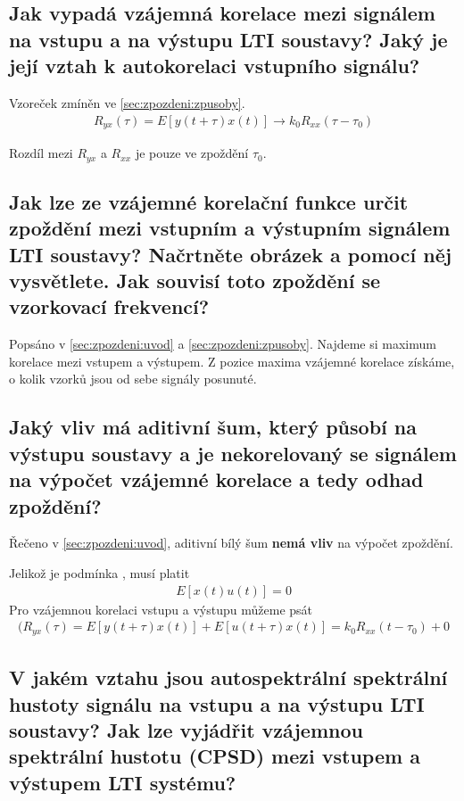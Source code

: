 \documentclass[a4paper,12pt]{article}   %
\newcommand{\mt}[1]{$#1$}
\begin{document}
\subsection{Jak vypadá vzájemná korelace mezi signálem na vstupu a na výstupu LTI soustavy? Jaký je její vztah k autokorelaci vstupního signálu?}
Vzoreček zmíněn ve \ref{sec:zpozdeni:zpusoby}.
\begin{align*}
        R_{yx}(\tau) = E[y(t+\tau)x(t)] \rightarrow k_0R_{xx}(\tau-\tau_0)
\end{align*}

Rozdíl mezi \mt{R_{yx}} a \mt{R_{xx}} je pouze ve zpoždění \mt{\tau_0}.


\subsection{Jak lze ze vzájemné korelační funkce určit zpoždění mezi vstupním a výstupním signálem LTI soustavy? Načrtněte obrázek a pomocí něj vysvětlete. Jak souvisí toto zpoždění se vzorkovací frekvencí?}
Popsáno v \ref{sec:zpozdeni:uvod} a \ref{sec:zpozdeni:zpusoby}. Najdeme si maximum korelace mezi vstupem a výstupem. Z pozice maxima vzájemné korelace získáme, o kolik vzorků jsou od sebe signály posunuté.


\subsection{Jaký vliv má aditivní šum, který působí na výstupu soustavy a je nekorelovaný se signálem na výpočet vzájemné korelace a tedy odhad zpoždění?}
Řečeno v \ref{sec:zpozdeni:uvod}, aditivní bílý šum \textbf{nemá vliv} na výpočet zpoždění. 

Jelikož je podmínka , musí platit
\begin{align*}
        E[x(t)u(t)] = 0
\end{align*}
Pro vzájemnou korelaci vstupu a výstupu můžeme psát
\begin{align*}(
        R_{yx}(\tau) = E[y(t+\tau)x(t)] + E[u(t+\tau)x(t)] = k_0R_{xx}(t-\tau_0) + 0 
\end{align*}


\subsection{V jakém vztahu jsou autospektrální spektrální hustoty signálu na vstupu a na výstupu LTI soustavy? Jak lze vyjádřit vzájemnou spektrální hustotu (CPSD) mezi vstupem a výstupem LTI systému?} \label{sec:zpozdeni:SyxRyx}
\end{document}
